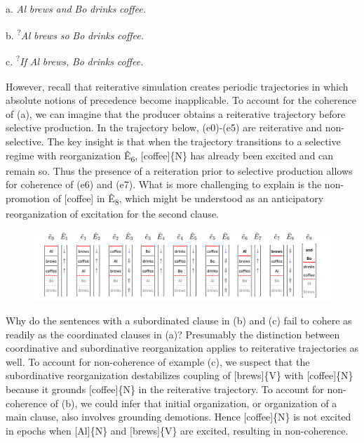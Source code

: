 a. \textit{Al} \textit{brews} \textit{and} \textit{Bo} \textit{drinks} \textit{coffee.}

b. \textsuperscript{?}\textit{Al} \textit{brews} \textit{so} \textit{Bo} \textit{drinks} \textit{coffee.}

c.\textsubscript{} \textsuperscript{?}\textit{If} \textit{Al} \textit{brews,} \textit{Bo} \textit{drinks} \textit{coffee.}

  However, recall that reiterative simulation creates periodic trajectories in which absolute notions of precedence become inapplicable. To account for the coherence of (a), we can imagine that the producer obtains a reiterative trajectory before selective production. In the trajectory below, (e0)-(e5) are reiterative and non-selective. The key insight is that when the trajectory transitions to a selective regime with reorganization Ê\textsubscript{6}, [coffee]\{N\} has already been excited and can remain so. Thus the presence of a reiteration prior to selective production allows for coherence of (e6) and (e7). What is more challenging to explain is the non-promotion of [coffee] in Ê\textsubscript{8}, which might be understood as an anticipatory reorganization of excitation for the second clause.

  
\begin{figure}
\includegraphics[width=\textwidth]{figures/Tilsen-img150.png}
\caption{\missingcaption}
\label{fig:}
\end{figure}
 

  Why do the sentences with a subordinated clause in (b) and (c) fail to cohere as readily as the coordinated clauses in (a)? Presumably the distinction between coordinative and subordinative reorganization applies to reiterative trajectories as well. To account for non-coherence of example (c), we suspect that the subordinative reorganization destabilizes coupling of [brews]\{V\} with [coffee]\{N\} because it grounds [coffee]\{N\} in the reiterative trajectory. To account for non-coherence of (b), we could infer that initial organization, or organization of a main clause, also involves grounding demotions. Hence [coffee]\{N\} is not excited in epochs when [Al]\{N\} and [brews]\{V\} are excited, resulting in non-coherence. 

